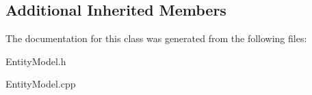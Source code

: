 \subsection*{Additional Inherited Members}


The documentation for this class was generated from the following files\-:\begin{DoxyCompactItemize}
\item 
Entity\-Model.\-h\item 
Entity\-Model.\-cpp\end{DoxyCompactItemize}
